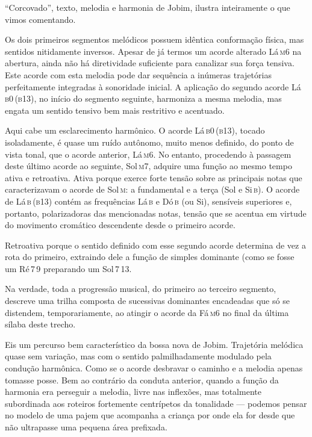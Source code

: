 ``Corcovado'', texto, melodia e harmonia de Jobim, ilustra inteiramente o
que vimos comentando.



Os dois primeiros segmentos melódicos possuem idêntica conformação
física, mas sentidos nitidamente inversos. Apesar de já termos um acorde
alterado Lá\,\textsc{m6} na abertura, ainda não há diretividade suficiente para
canalizar sua força tensiva. Este acorde com esta melodia pode dar
sequência a inúmeras trajetórias perfeitamente integradas à sonoridade
inicial. A aplicação do segundo acorde Lá\,\textsc{b0\,(b13)}, no início do
segmento seguinte, harmoniza a mesma melodia, mas engata um sentido
tensivo bem mais restritivo e acentuado.

Aqui cabe um esclarecimento harmônico. O acorde Lá\,\textsc{b0\,(b13)}, tocado
isoladamente, é quase um ruído autônomo, muito menos definido, do ponto
de vista tonal, que o acorde anterior, Lá\,\textsc{m6}. No entanto, procedendo à
passagem deste último acorde ao seguinte, Sol\,\textsc{m7}, adquire uma função ao
mesmo tempo ativa e retroativa. Ativa porque exerce forte tensão sobre
as principais notas que caracterizavam o acorde de Sol\,\textsc{m}: a fundamental e
a terça (Sol e Si\,\textsc{b}). O acorde de Lá\,\textsc{b\,(b13)} contém as frequências Lá\,\textsc{b} e
Dó\,\textsc{b} (ou Si), sensíveis superiores e, portanto, polarizadoras das
mencionadas notas, tensão que se acentua em virtude do movimento
cromático descendente desde o primeiro acorde. 



Retroativa porque o sentido definido com esse segundo acorde determina
de vez a rota do primeiro, extraindo dele a função de simples dominante
(como se fosse um Ré\,\textsc{7\,9} preparando um Sol\,\textsc{7\,13}.

Na verdade, toda a progressão musical, do primeiro ao terceiro segmento,
descreve uma trilha composta de sucessivas dominantes encadeadas que só
se distendem, temporariamente, ao atingir o acorde da Fá\,\textsc{m6} no final da
última sílaba deste trecho.


Eis um percurso bem característico da bossa nova de Jobim. Trajetória
melódica quase sem variação, mas com o sentido palmilhadamente modulado
pela condução harmônica. Como se o acorde desbravar o caminho e a
melodia apenas tomasse posse. Bem ao contrário da conduta anterior,
quando a função da harmonia era perseguir a melodia, livre nas
inflexões, mas totalmente subordinada aos roteiros fortemente
centrípetos da tonalidade --- podemos pensar no modelo de uma pajem que
acompanha a criança por onde ela for desde que não ultrapasse uma
pequena área prefixada.


